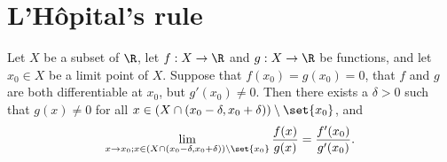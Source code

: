 \section{L'Hôpital's rule}\label{sec:10.5}

\begin{prop}\label{10.5.1}
  Let \(X\) be a subset of \(\R\), let \(f : X \to \R\) and \(g : X \to \R\) be functions, and let \(x_0 \in X\) be a limit point of \(X\).
  Suppose that \(f(x_0) = g(x_0) = 0\), that \(f\) and \(g\) are both differentiable at \(x_0\), but \(g'(x_0) \neq 0\).
  Then there exists a \(\delta > 0\) such that \(g(x) \neq 0\) for all \(x \in (X \cap (x_0 - \delta, x_0 + \delta)) \setminus \set{x_0}\), and
  \[
    \lim_{x \to x_0 ; x \in (X \cap (x_0 - \delta, x_0 + \delta)) \setminus \set{x_0}} \dfrac{f(x)}{g(x)} = \dfrac{f'(x_0)}{g'(x_0)}.
  \]
\end{prop}

